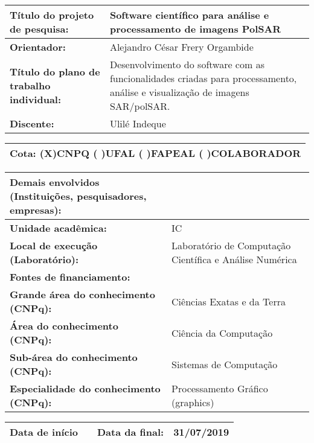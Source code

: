 \documentclass[a4paper,12pt]{article}
\begin{document}
\begin{center}
\begin{table}[h]
\centering
\begin{tabular}{|p{}|p{}|} \hline 
     \textbf{Título do projeto de pesquisa: }& Software científico para análise e processamento de imagens PolSAR \\ 
     \hline
     \textbf{Orientador: }& Alejandro César Frery Orgambide  \\  
     \hline
     \textbf{Título do plano de trabalho individual:} & Desenvolvimento do software com as funcionalidades criadas para processamento, análise e visualização de imagens SAR/polSAR. \\ 
     \hline
     \textbf{Discente:} & Ulilé Indeque\\ 
     \hline
     \end{tabular}
     \begin{tabular}{|p{}|}
     \textbf{Cota: (X)CNPQ ( )UFAL ( )FAPEAL ( )COLABORADOR} \\ 
     \hline
\end{tabular}
\begin{tabular}{|p{}|p{}|}
    \textbf{Demais envolvidos (Instituições, pesquisadores, empresas):} & \\ \hline
     \textbf{Unidade acadêmica:} &  IC\\
    \hline
    \textbf{Local de execução (Laboratório):} &  Laboratório de Computação Científica e Análise Numérica\\
    \hline
    \textbf{Fontes de financiamento:} & \\ 
    \hline
    \textbf{Grande área do conhecimento (CNPq):} &  Ciências Exatas e da Terra\\
    \hline
    \textbf{Área do conhecimento (CNPq):} &  Ciência da Computação\\
    \hline
    \textbf{Sub-área do conhecimento (CNPq):} &  Sistemas de Computação\\
    \hline
    \textbf{Especialidade do conhecimento (CNPq):} &  Processamento Gráfico (graphics)\\
    \hline
\end{tabular}
\begin{tabular}{|p{}|p{3cm}|p{5cm}|p{}|}
  \textbf{Data de início} & \centering{\textbf{01/08/2018}}  & \textbf{Data da final:} & \textbf{31/07/2019}\\
\hline
\end{tabular}
\end{table}

\end{center}
\end{document}
